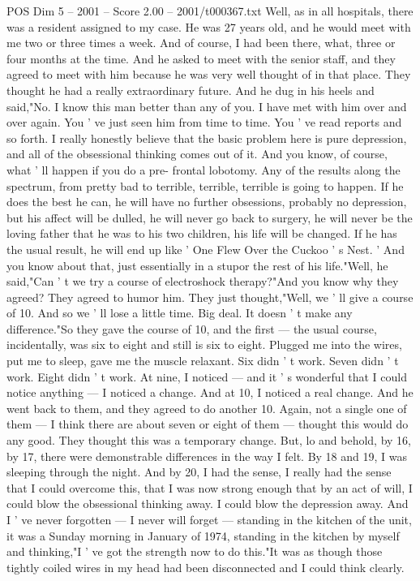 \begin{textsample}{POS Dim 5 – 2001 – Score 2.00 – 2001/t000367.txt}
Well, as in all hospitals, there was a resident assigned to my case.
He was 27 years old, and he would meet with me two or three times a week.
And of course, I had been there, what, three or four months at the time.
And he asked to meet with the senior staff, and they agreed to meet with him because he was very well thought of in that place.
They thought he had a really extraordinary future.
And he dug in his heels and said,"No.
I know this man better than any of you.
I have met with him over and over again.
You ' ve just seen him from time to time.
You ' ve read reports and so forth.
I really honestly believe that the basic problem here is pure depression, and all of the obsessional thinking comes out of it.
And you know, of course, what ' ll happen if you do a pre- frontal lobotomy.
Any of the results along the spectrum, from pretty bad to terrible, terrible, terrible is going to happen.
If he does the best he can, he will have no further obsessions, probably no depression, but his affect will be dulled, he will never go back to surgery, he will never be the loving father that he was to his two children, his life will be changed.
If he has the usual result, he will end up like ' One Flew Over the Cuckoo ' s Nest. ' And you know about that, just essentially in a stupor the rest of his life."Well, he said,"Can ' t we try a course of electroshock therapy?"And you know why they agreed?
They agreed to humor him.
They just thought,"Well, we ' ll give a course of 10.
And so we ' ll lose a little time.
Big deal.
It doesn ' t make any difference."So they gave the course of 10, and the first — the usual course, incidentally, was six to eight and still is six to eight.
Plugged me into the wires, put me to sleep, gave me the muscle relaxant.
Six didn ' t work.
Seven didn ' t work.
Eight didn ' t work.
At nine, I noticed — and it ' s wonderful that I could notice anything — I noticed a change.
And at 10, I noticed a real change.
And he went back to them, and they agreed to do another 10.
Again, not a single one of them — I think there are about seven or eight of them — thought this would do any good.
They thought this was a temporary change.
But, lo and behold, by 16, by 17, there were demonstrable differences in the way I felt.
By 18 and 19, I was sleeping through the night.
And by 20, I had the sense, I really had the sense that I could overcome this, that I was now strong enough that by an act of will, I could blow the obsessional thinking away.
I could blow the depression away.
And I ' ve never forgotten — I never will forget — standing in the kitchen of the unit, it was a Sunday morning in January of 1974, standing in the kitchen by myself and thinking,"I ' ve got the strength now to do this."It was as though those tightly coiled wires in my head had been disconnected and I could think clearly.

\end{textsample}
